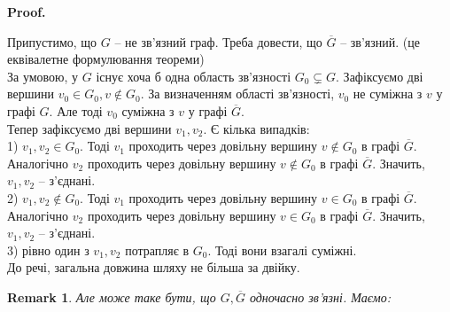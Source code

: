 \documentclass[a4paper, 14pt]{extarticle}
\makeatletter
\theoremstyle{theoremdd}
\theoremstyle{theoremdd}
\theoremstyle{theoremdd}
\theoremstyle{theoremdd}
\theoremstyle{theoremdd}
\theoremstyle{theoremdd}
\theoremstyle{theoremdd}
\theoremstyle{theoremdd}
\theoremstyle{theoremdd}
\theoremstyle{theoremdd}
\theoremstyle{theoremdd}
\newtheorem{remark}[theorem]{Remark}
\theoremstyle{theoremdd}
\theoremstyle{theoremdd}
\theoremstyle{theoremdd}
\theoremstyle{theoremdd}
\renewenvironment{proof}[1][Proof.\\]{\par
\pushQED{\hfill \qed}%
\normalfont \topsep6\p@\@plus6\p@\relax
\trivlist
\item\relax
{\bfseries
#1\@addpunct{.}}\hspace\labelsep\ignorespaces
}{%
\popQED\endtrivlist\@endpefalse
}
\makeatother
\begin{document}
\begin{proof}
Припустимо, що $G$ -- не зв'язний граф. Треба довести, що $\overline{G}$ -- зв'язний. (це еквівалетне формулювання теореми)\\
За умовою, у $G$ існує хоча б одна область зв'язності $G_0 \subsetneq G$. Зафіксуємо дві вершини $v_0 \in G_0, v \notin G_0$. За визначенням області зв'язності, $v_0$ не суміжна з $v$ у графі $G$. Але тоді $v_0$ суміжна з $v$ у графі $\overline{G}$.\\
Тепер зафіксуємо дві вершини $v_1,v_2$. Є кілька випадків:\\
1) $v_1,v_2 \in G_0$. Тоді $v_1$ проходить через довільну вершину $v \notin G_0$  в графі $\overline{G}$. Аналогічно $v_2$ проходить через довільну вершину $v \notin G_0$  в графі $\overline{G}$. Значить, $v_1,v_2$ -- з'єднані.\\
2) $v_1,v_2 \notin G_0$. Тоді $v_1$ проходить через довільну вершину $v \in G_0$  в графі $\overline{G}$. Аналогічно $v_2$ проходить через довільну вершину $v \in G_0$  в графі $\overline{G}$. Значить, $v_1,v_2$ -- з'єднані.\\
3) рівно один з $v_1,v_2$ потрапляє в $G_0$. Тоді вони взагалі суміжні.\\
До речі, загальна довжина шляху не більша за двійку.
\end{proof}

\begin{remark}
Але може таке бути, що $G,\overline{G}$ одночасно зв'язні. Маємо:
\begin{figure}[H]
\centering
{}
\qquad
{}
\end{figure}
\end{remark}
\end{document}
